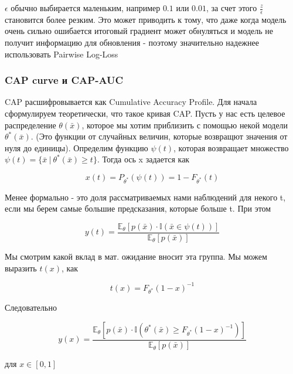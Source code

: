 \documentclass{article}
\begin{document}
    $\epsilon$ обычно выбирается маленьким, например $0.1$ или $0.01$, за счет этого $\frac{z}{\epsilon}$ становится более резким. 
    Это может приводить к тому, что даже когда модель очень сильно ошибается итоговый градиент может обнуляться и модель не получит информацию 
    для обновления - поэтому значительно надежнее использовать Pairwise Log-Loss


    \subsubsection{CAP curve и CAP-AUC}

    CAP расшифровывается как Cumulative Accuracy Profile. Для начала сформулируем теоретически, что такое кривая CAP. 
    Пусть у нас есть целевое распределение $\theta(\bar{x})$, которое мы хотим приблизить с помощью некой модели $\theta^{*}(\bar{x})$. (Это функции от случайных величин, которые возвращют значения от 
    нуля до единицы). Определим функцию $\psi(t)$, которая возвращает множество 
    $\psi(t) = \{\bar{x} \ | \ \theta^{*}(\bar{x}) \geq t   \}$. Тогда ось x задается как 

    \begin{equation}
        x(t) = P_{\theta^{*}}(\psi(t)) = 1 - F_{\theta^{*}}(t)
    \end{equation}

    Менее формально - это доля рассматриваемых нами наблюдений для некого t, если мы берем самые большие предсказания, которые больше t.
    При этом 

    \begin{equation}
        y(t) = \frac{\mathbb{E}_{\theta}[p(\bar{x}) \cdot \mathbb{I}(\bar{x} \in \psi(t)) ]}{\mathbb{E}_{\theta}[p(\bar{x})]}
    \end{equation}

    Мы смотрим какой вклад в мат. ожидание вносит эта группа. Мы можем выразить $t(x)$, как 

    \begin{equation}
        t(x) = F_{\theta^{*}}(1 - x)^{-1}
    \end{equation}

    Следовательно

    \begin{equation}
        y(x) = \frac{\mathbb{E}_{\theta}[p(\bar{x}) \cdot \mathbb{I}(\theta^{*}(\bar{x}) \geq F_{\theta^{*}}(1 - x)^{-1}) ]}{\mathbb{E}_{\theta}[p(\bar{x})]}
    \end{equation}

    для $x \in [0, 1]$
\end{document}
